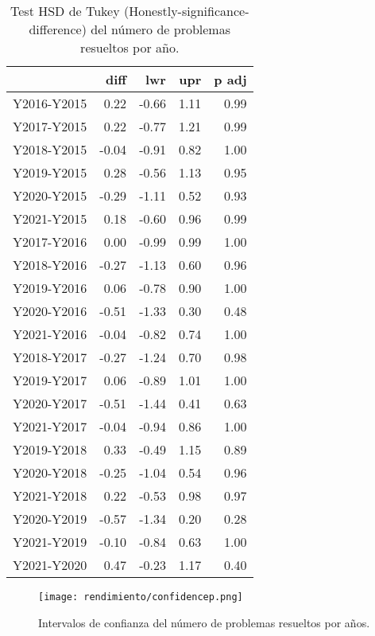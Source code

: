 \begin{table}[ht]
\centering
\caption{Test HSD de Tukey (Honestly-significance-difference) del número de problemas resueltos por año.}
\label{tab:Tukeyperformer}
\begin{tabular}{rrrrr}
  \hline
 & diff & lwr & upr & p adj \\ 
  \hline
Y2016-Y2015 & 0.22 & -0.66 & 1.11 & 0.99 \\ 
  Y2017-Y2015 & 0.22 & -0.77 & 1.21 & 0.99 \\ 
  Y2018-Y2015 & -0.04 & -0.91 & 0.82 & 1.00 \\ 
  Y2019-Y2015 & 0.28 & -0.56 & 1.13 & 0.95 \\ 
  Y2020-Y2015 & -0.29 & -1.11 & 0.52 & 0.93 \\ 
  Y2021-Y2015 & 0.18 & -0.60 & 0.96 & 0.99 \\ 
  Y2017-Y2016 & 0.00 & -0.99 & 0.99 & 1.00 \\ 
  Y2018-Y2016 & -0.27 & -1.13 & 0.60 & 0.96 \\ 
  Y2019-Y2016 & 0.06 & -0.78 & 0.90 & 1.00 \\ 
  Y2020-Y2016 & -0.51 & -1.33 & 0.30 & 0.48 \\ 
  Y2021-Y2016 & -0.04 & -0.82 & 0.74 & 1.00 \\ 
  Y2018-Y2017 & -0.27 & -1.24 & 0.70 & 0.98 \\ 
  Y2019-Y2017 & 0.06 & -0.89 & 1.01 & 1.00 \\ 
  Y2020-Y2017 & -0.51 & -1.44 & 0.41 & 0.63 \\ 
  Y2021-Y2017 & -0.04 & -0.94 & 0.86 & 1.00 \\ 
  Y2019-Y2018 & 0.33 & -0.49 & 1.15 & 0.89 \\ 
  Y2020-Y2018 & -0.25 & -1.04 & 0.54 & 0.96 \\ 
  Y2021-Y2018 & 0.22 & -0.53 & 0.98 & 0.97 \\ 
  Y2020-Y2019 & -0.57 & -1.34 & 0.20 & 0.28 \\ 
  Y2021-Y2019 & -0.10 & -0.84 & 0.63 & 1.00 \\ 
  Y2021-Y2020 & 0.47 & -0.23 & 1.17 & 0.40 \\ 
   \hline
\end{tabular}
\end{table}

\begin{figure}[H]
    \centering
    \texttt{[image: rendimiento/confidencep.png]}
    \caption{Intervalos de confianza del número de problemas resueltos por años.}
    \label{fig:confidenceperformer}
\end{figure}


